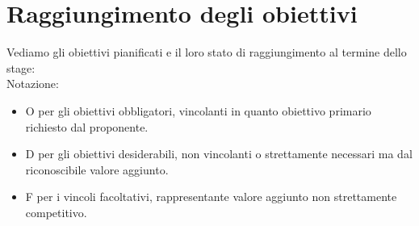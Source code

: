\section{Raggiungimento degli obiettivi}
Vediamo gli obiettivi pianificati e il loro stato di raggiungimento al termine dello stage: 
\\
Notazione:
\\
\begin{itemize}
    \item O per gli obiettivi obbligatori, vincolanti in quanto obiettivo primario richiesto dal proponente.
    \item D per gli obiettivi desiderabili, non vincolanti o strettamente necessari ma dal riconoscibile valore aggiunto.
    \item F per i vincoli facoltativi, rappresentante valore aggiunto non strettamente competitivo.
\end{itemize}
\leavevmode\newline
